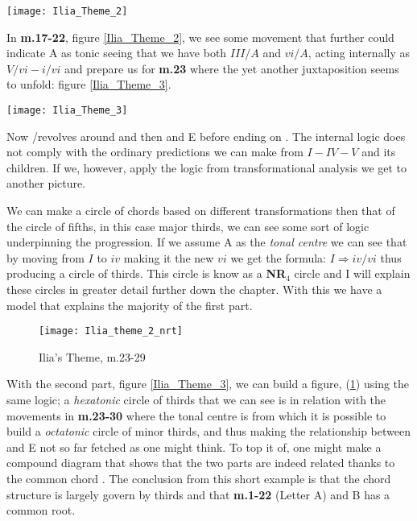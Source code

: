\begin{figure*}[h!]
\texttt{[image: Ilia\_Theme\_2]}
	\caption{Ilia's Theme 2}
	\label{Ilia_Theme_2}
\end{figure*}

In \textbf{m.17-22}, figure \ref{Ilia_Theme_2}, we see some movement that further could indicate A as tonic seeing that we have both \(III/A\) and \(vi/A\), acting internally as \(V/vi-i/vi\) and prepare us for \textbf{m.23} where the yet another juxtaposition seems to unfold: figure \ref{Ilia_Theme_3}.

\begin{figure*}[h!]
\texttt{[image: Ilia\_Theme\_3]}
	\caption{Ilia's Theme 3}
	\label{Ilia_Theme_3}
\end{figure*}

Now \dflat/\ciss revolves around \bflat and then \bflat and E before ending on . The internal logic does not comply with the ordinary predictions we can make from \(I-IV-V\) and its children. If we, however, apply the logic from transformational analysis we get to another picture.

We can make a circle of chords based on different transformations then that of the circle of fifths, in this case major thirds, we can see some sort of logic underpinning the progression. If we assume A as the \textit{tonal centre} we can see that by moving from \(I\) to \(iv\) making it the new \(vi\) we get the formula: \({I}\Rightarrow{iv/vi}\) thus producing a circle of thirds. This circle is know as a \textbf{NR\(_{4}\)} circle and I will explain these circles in greater detail further down the chapter. With this we have a model that explains the majority of the first part.

\begin{figure}[h!]
\center
\texttt{[image: Ilia\_theme\_2\_nrt]}
	\caption{Ilia's Theme, m.23-29}
	\label{Ilia_theme_2_nrt}
\end{figure}

With the second part, figure \ref{Ilia_Theme_3}, we can build a figure, (\ref{Ilia_theme_2_nrt}) using the same logic; a \textit{hexatonic} circle of thirds that we can see is in relation with the movements in \textbf{m.23-30} where the tonal centre is \ciss from which it is possible to build a \textit{octatonic} circle of minor thirds, and thus making the relationship between \bflat and E not so far fetched as one might think. To top it of, one might make a compound diagram that shows that the two parts are indeed related thanks to the common chord \ciss. The conclusion from this short example is that the chord structure is largely govern by thirds and that \textbf{m.1-22} (Letter A) and B has a common root.

